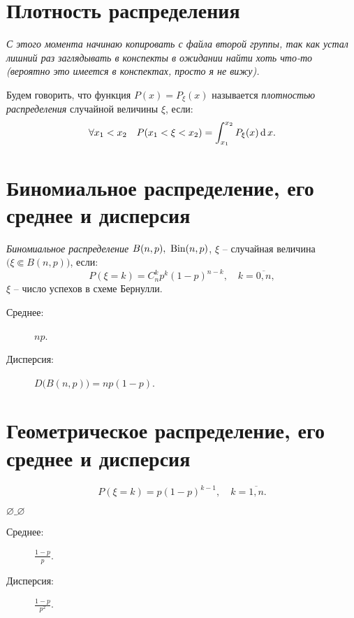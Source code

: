 \section{Плотность распределения}

\begin{note}
	\emph{С этого момента начинаю копировать с файла второй группы, так как устал лишний раз заглядывать в конспекты в ожидании найти хоть что-то (вероятно это имеется в конспектах, просто я не вижу).}
\end{note}

\begin{definition}
	Будем говорить, что функция $P(x) = P_{\xi } (x)$ называется \emph{плотностью распределения} случайной величины $\xi $, если:
	\[
		\forall x_1 < x_2 \quad P(x_1 < \xi < x_2) = \int_{x_1}^{x_2} P_{\xi } (x)\operatorname{d} x.
	\]
\end{definition}

\newpage

\section{Биномиальное распределение, его среднее и дисперсия}

\begin{definition}
	\emph{Биномиальное распределение} $B(n,p), \ \operatorname{Bin}(n,p)$, $\xi $ -- случайная величина $\big(\xi \Subset B(n,p) \big)$, если:
	\[
		P(\xi = k) = C_{n}^{k} p^k (1- p)^{n-k}, \quad k = \overline{0,n} ,
	\]
	$\xi $ -- число успехов в схеме Бернулли.

	\begin{description}
		\item[Среднее:] $np$.
		\item[Дисперсия:] $D \big(B(n,p)\big) = np(1-p)$.
	\end{description}
\end{definition}

\section{Геометрическое распределение, его среднее и дисперсия}

\begin{definition}
	\[
		P(\xi = k) = p(1-p)^{k-1} , \quad k = \overline{1,n} .
	\]

	$\varnothing \_ \varnothing$

	\begin{description}
		\item[Среднее:] $\frac{1-p}{p} $.
		\item[Дисперсия:] $\frac{1-p}{p^2} $.
	\end{description}
\end{definition}


